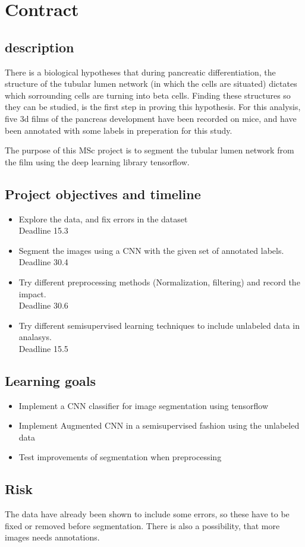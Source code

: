 
\section*{Contract} %
\label{sec:contract}
\subsection{description} %
\label{sub:description}
There is a biological hypotheses that during pancreatic differentiation, the
structure of the tubular lumen network (in which the cells are situated)
dictates which sorrounding cells are turning into beta cells.
Finding these structures so they can be studied, is the first step in proving
this hypothesis.
For this analysis, five 3d films of the pancreas development have been recorded on
mice, and have been annotated with some labels in preperation for this study.

The purpose of this MSc project is to segment the tubular lumen network from
the film using the deep learning library tensorflow.

\subsection*{Project objectives and timeline} %
\label{sec:project_goal}
\begin{itemize}
    \item Explore the data, and fix errors in the dataset\\
    Deadline 15.3
    \item Segment the images using a CNN with the given set of annotated labels.\\
    Deadline 30.4
    \item Try different preprocessing methods (Normalization, filtering) and record the impact.\\
    Deadline 30.6
    \item Try different semisupervised learning techniques to include unlabeled
    data in analasys.\\
    Deadline 15.5
\end{itemize}

\subsection*{Learning goals}
\begin{itemize}
    \item Implement a CNN classifier for image segmentation using tensorflow
    \item Implement Augmented CNN in a semisupervised fashion using the unlabeled data
    \item Test improvements of segmentation when preprocessing
\end{itemize}

\subsection*{Risk} %
\label{sec:risk}
The data have already been shown to include some errors, so these have to be
fixed or removed before segmentation.
There is also a possibility, that more images needs annotations.
